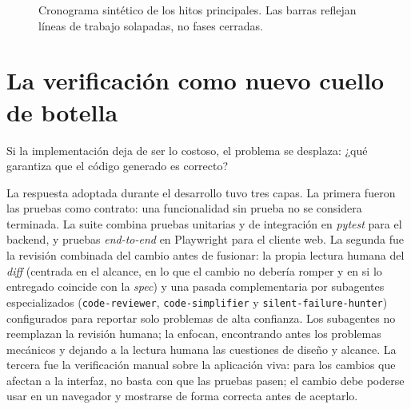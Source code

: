 \begin{figure}[H]
\begin{center}
\caption[Cronograma de desarrollo]{Cronograma sintético de
los hitos principales. Las barras reflejan líneas de trabajo solapadas, no
fases cerradas.}
\label{fig:cronograma-desarrollo}
\end{center}
\end{figure}

\section{La verificación como nuevo cuello de botella}

Si la implementación deja de ser lo costoso, el problema se desplaza:
¿qué garantiza que el código generado es correcto?

La respuesta adoptada durante el desarrollo tuvo tres capas. La primera fueron
las pruebas como contrato: una funcionalidad sin prueba no se
considera terminada. La suite combina pruebas unitarias y de integración
en \textit{pytest} para el backend, y pruebas \textit{end-to-end} en
Playwright para el cliente web. La segunda fue la revisión combinada del cambio
antes de fusionar: la propia lectura humana del
\textit{diff} (centrada en el alcance, en lo que el cambio no
debería romper y en si lo entregado coincide con la \textit{spec}) y
una pasada complementaria por subagentes especializados
(\texttt{code-reviewer}, \texttt{code-simplifier} y
\texttt{silent-failure-hunter}) configurados para reportar solo
problemas de alta confianza. Los subagentes no reemplazan la revisión
humana; la enfocan, encontrando antes los problemas mecánicos y
dejando a la lectura humana las cuestiones de diseño y alcance. La
tercera fue la verificación manual sobre la aplicación viva: para los cambios
que afectan a la interfaz, no basta con que las
pruebas pasen; el cambio debe poderse usar en un navegador y mostrarse
de forma correcta antes de aceptarlo.

